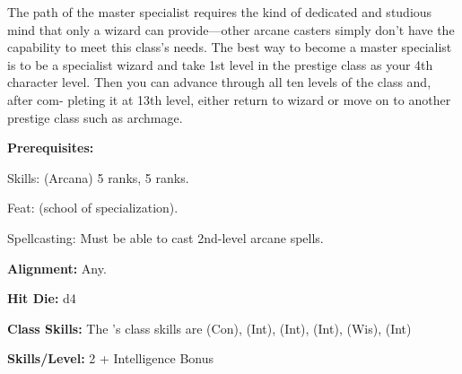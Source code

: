 
The path of the master specialist requires the kind of dedicated and studious mind that only a wizard can provide—other arcane casters simply don't have the capability to meet this class's needs. The best way to become a master specialist is to be a specialist wizard and take 1st level in the prestige class as your 4th character level. Then you can advance through all ten levels of the class and, after com- pleting it at 13th level, either return to wizard or move on to another prestige class such as archmage.

\textbf{Prerequisites:} 
\begin{description*}
\item[\hspace*{1.5cm}Skills:]  (Arcana) 5 ranks,  5 ranks.
\item[\hspace*{1.5cm}Feat:]  (school of specialization).
\item[\hspace*{1.5cm}Spellcasting:] Must be able to cast 2nd-level arcane spells.
\end{description*}

\textbf{Alignment:} Any.

\textbf{Hit Die:} d4

\textbf{Class Skills:} The \currentclassname{}'s class skills are  (Con),  (Int),  (Int),  (Int),  (Wis),  (Int)

\textbf{Skills/Level:} 2 + Intelligence Bonus

\poorbab{}
\poorfor{}
\poorref{}
\goodwil{}

